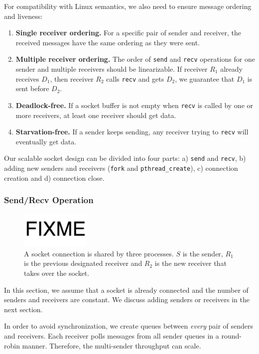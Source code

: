 For compatibility with Linux semantics, we also need to ensure message ordering and liveness:
\begin{enumerate}
\item \textbf{Single receiver ordering.} For a specific pair of sender and receiver, the received messages have the same ordering as they were sent.
\item \textbf{Multiple receiver ordering.} The order of \texttt{send} and \texttt{recv} operations for one sender and multiple receivers should be linearizable. If receiver $R_1$ already receives $D_1$, then receiver $R_2$ calls \texttt{recv} and gets $D_2$, we guarantee that $D_1$ is sent before $D_2$.
\item \textbf{Deadlock-free.} If a socket buffer is not empty when \texttt{recv} is called by one or more receivers, at least one receiver should get data.
\item \textbf{Starvation-free.} If a sender keeps sending, any receiver trying to \texttt{recv} will eventually get data.
\end{enumerate}

Our scalable socket design can be divided into four parts: a) \texttt{send} and \texttt{recv}, b) adding new senders and receivers (\texttt{fork} and \texttt{pthread\_create}), c) connection creation and d) connection close.

\subsubsection{Send/Recv Operation}
\label{subsubsec:fork_rdwr}

\begin{figure}[t]
	\centering
	\includegraphics[width=0.3\textwidth]{images/fixme}
	\caption{A socket connection is shared by three processes. $S$ is the sender, $R_1$ is the previous designated receiver and $R_2$ is the new receiver that takes over the socket.}
	\label{fig:fork-takeover}
\end{figure}

In this section, we assume that a socket is already connected and the number of senders and receivers are constant. We discuss adding senders or receivers in the next section.

In order to avoid synchronization, we create queues between \emph{every} pair of senders and receivers. %
Each receiver polls messages from all sender queues in a round-robin manner. Therefore, the multi-sender throughput can scale.

